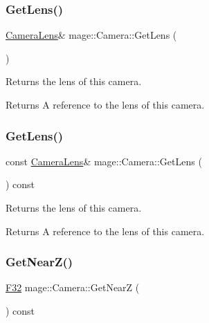 \subsubsection{\texorpdfstring{Get\+Lens()}{GetLens()}\hspace{0.1cm}{\footnotesize\ttfamily [1/2]}}
{\footnotesize\ttfamily \hyperlink{classmage_1_1_camera_lens}{Camera\+Lens}\& mage\+::\+Camera\+::\+Get\+Lens (\begin{DoxyParamCaption}{ }\end{DoxyParamCaption})\hspace{0.3cm}{\ttfamily [noexcept]}}

Returns the lens of this camera.

\begin{DoxyReturn}{Returns}
A reference to the lens of this camera. 
\end{DoxyReturn}
\hypertarget{classmage_1_1_camera_ac2529ae81deabfbfed8f96cbf5b778eb}{}\label{classmage_1_1_camera_ac2529ae81deabfbfed8f96cbf5b778eb} 
\subsubsection{\texorpdfstring{Get\+Lens()}{GetLens()}\hspace{0.1cm}{\footnotesize\ttfamily [2/2]}}
{\footnotesize\ttfamily const \hyperlink{classmage_1_1_camera_lens}{Camera\+Lens}\& mage\+::\+Camera\+::\+Get\+Lens (\begin{DoxyParamCaption}{ }\end{DoxyParamCaption}) const\hspace{0.3cm}{\ttfamily [noexcept]}}

Returns the lens of this camera.

\begin{DoxyReturn}{Returns}
A reference to the lens of this camera. 
\end{DoxyReturn}
\hypertarget{classmage_1_1_camera_add4054d66911dd183cdec85eda77b4a1}{}\label{classmage_1_1_camera_add4054d66911dd183cdec85eda77b4a1} 
\subsubsection{\texorpdfstring{Get\+Near\+Z()}{GetNearZ()}}
{\footnotesize\ttfamily \hyperlink{namespacemage_aa97e833b45f06d60a0a9c4fc22ae02c0}{F32} mage\+::\+Camera\+::\+Get\+NearZ (\begin{DoxyParamCaption}{ }\end{DoxyParamCaption}) const\hspace{0.3cm}{\ttfamily [noexcept]}}


